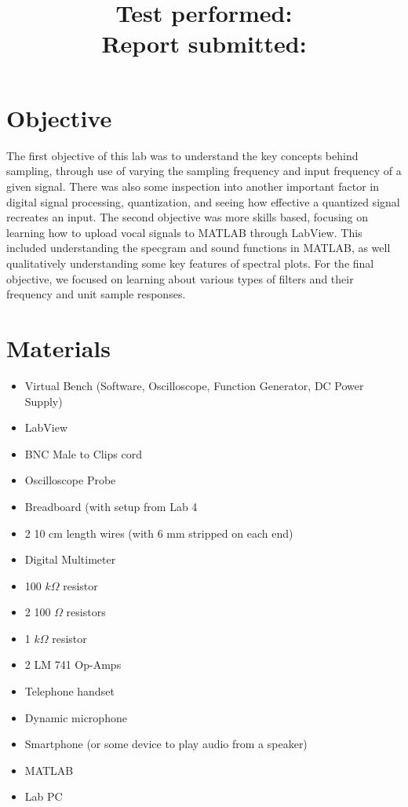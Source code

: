 \documentclass[10pt]{article}
\title{
    \textbf{\courseTitle} \\
    \textbf{\documentTitle} \\
    \bigskip
    \textbf{\large{Test performed: \testDate}} \\
    \textbf{\large{Report submitted: \reportDate}} \\
    \bigskip
    \bigskip
}
\author{\documentAuthor}
\date{}
\begin{document}
\maketitle

\newpage

\section{Objective}

The first objective of this lab was to understand the key concepts behind sampling, through use of varying the sampling frequency and input frequency of a given signal. There was also some inspection into another important factor in digital signal processing, quantization, and seeing how effective a quantized signal recreates an input. The second objective was more skills based, focusing on learning how to upload vocal signals to MATLAB through LabView. This included understanding the specgram and sound functions in MATLAB, as well qualitatively understanding some key features of spectral plots. For the final objective, we focused on learning about various types of filters and their frequency and unit sample responses.

\medskip
\section{Materials}
\begin{itemize}
	\item Virtual Bench (Software, Oscilloscope, Function Generator, DC Power Supply)
	\item LabView
	\item BNC Male to Clips cord
	\item Oscilloscope Probe
	\item Breadboard (with setup from Lab 4
	\item 2 10 cm length wires (with 6 mm stripped on each end)
	\item Digital Multimeter
	\item 100 $k\Omega$ resistor
	\item 2 100 $\Omega$ resistors
	\item 1 $k\Omega$ resistor
	\item 2 LM 741 Op-Amps
	\item Telephone handset
	\item Dynamic microphone
	\item Smartphone (or some device to play audio from a speaker)
	\item MATLAB
	\item Lab PC
\end{itemize}
\end{document}
